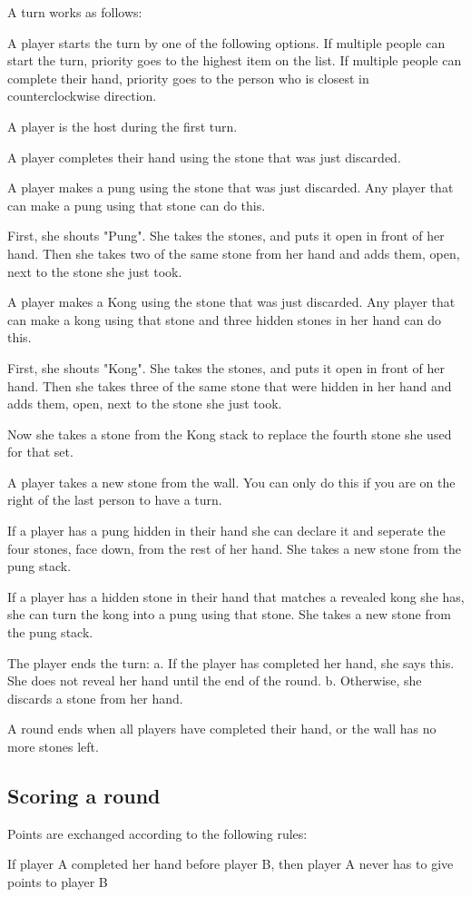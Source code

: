 \documentclass{article}
\begin{document}
A turn works as follows:
\begin{enumerate*}
    \item A player starts the turn by one of the following options. If multiple people can start the turn, priority goes to the highest item on the list. If multiple people can complete their hand, priority goes to the person who is closest in counterclockwise direction.
    \begin{enumerate*}
        \item A player is the host during the first turn.
        \item A player completes their hand using the stone that was just discarded.
        \item A player makes a pung using the stone that was just discarded. Any player that can make a pung using that stone can do this.

        First, she shouts "Pung". She takes the stones, and puts it open in front of her hand. Then she takes two of the same stone from her hand and adds them, open, next to the stone she just took.
        \item A player makes a Kong using the stone that was just discarded. Any player that can make a kong using that stone and three hidden stones in her hand can do this.

        First, she shouts "Kong". She takes the stones, and puts it open in front of her hand. Then she takes three of the same stone that were hidden in her hand and adds them, open, next to the stone she just took.

        Now she takes a stone from the Kong stack to replace the fourth stone she used for that set.
        \item A player takes a new stone from the wall. You can only do this if you are on the right of the last person to have a turn.
    \end{enumerate*}
    \item If a player has a pung hidden in their hand she can declare it and seperate the four stones, face down, from the rest of her hand. She takes a new stone from the pung stack.
    \item If a player has a hidden stone in their hand that matches a revealed kong she has, she can turn the kong into a pung using that stone. She takes a new stone from the pung stack.
    \item The player ends the turn:
   a. If the player has completed her hand, she says this. She does not reveal her hand until the end of the round.
   b. Otherwise, she discards a stone from her hand.
\end{enumerate*}

A round ends when all players have completed their hand, or the wall has no more stones left.

\subsection{Scoring a round}
Points are exchanged according to the following rules:

If player A completed her hand before player B, then player A never has to give points to player B
\end{document}
